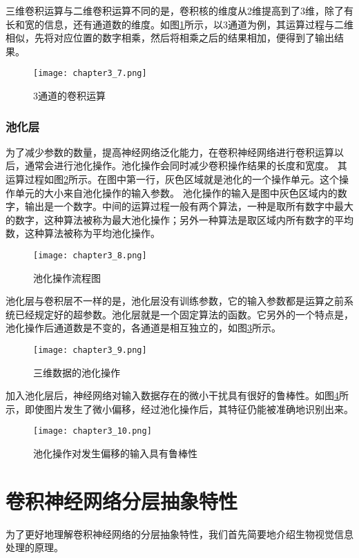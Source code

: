 三维卷积运算与二维卷积运算不同的是，卷积核的维度从2维提高到了3维，除了有长和宽的信息，还有通道数的维度。如图\ref{fig:chapter3_7}所示，以3通道为例，其运算过程与二维相似，先将对应位置的数字相乘，然后将相乘之后的结果相加，便得到了输出结果。
\begin{figure}
    \centering
    \texttt{[image: chapter3\_7.png]}
    \caption{3通道的卷积运算\cite{luyujie_216}}
    \label{fig:chapter3_7}
\end{figure}
\subsubsection{池化层}
为了减少参数的数量，提高神经网络泛化能力，在卷积神经网络进行卷积运算以后，通常会进行池化操作。池化操作会同时减少卷积操作结果的长度和宽度。
其运算过程如图\ref{fig:chapter3_8}所示。在图中第一行，灰色区域就是池化的一个操作单元。这个操作单元的大小来自池化操作的输入参数。
池化操作的输入是图中灰色区域内的数字，输出是一个数字。中间的运算过程一般有两个算法，一种是取所有数字中最大的数字，这种算法被称为最大池化操作；另外一种算法是取区域内所有数字的平均数，这种算法被称为平均池化操作。
\begin{figure}
    \centering
    \texttt{[image: chapter3\_8.png]}
    \caption{池化操作流程图\cite{luyujie_216}}
    \label{fig:chapter3_8}
\end{figure}

池化层与卷积层不一样的是，池化层没有训练参数，它的输入参数都是运算之前系统已经规定好的超参数。池化层就是一个固定算法的函数。它另外的一个特点是，池化操作后通道数是不变的，各通道是相互独立的，如图\ref{fig:chapter3_9}所示。
\begin{figure}
    \centering
    \texttt{[image: chapter3\_9.png]}
    \caption{三维数据的池化操作\cite{luyujie_216}}
    \label{fig:chapter3_9}
\end{figure}

加入池化层后，神经网络对输入数据存在的微小干扰具有很好的鲁棒性。如图\ref{fig:chapter3_10}所示，即使图片发生了微小偏移，经过池化操作后，其特征仍能被准确地识别出来。
\begin{figure}
    \centering
    \texttt{[image: chapter3\_10.png]}
    \caption{池化操作对发生偏移的输入具有鲁棒性\cite{luyujie_216}}
    \label{fig:chapter3_10}
\end{figure}

\section{卷积神经网络分层抽象特性}
为了更好地理解卷积神经网络的分层抽象特性，我们首先简要地介绍生物视觉信息处理的原理。
